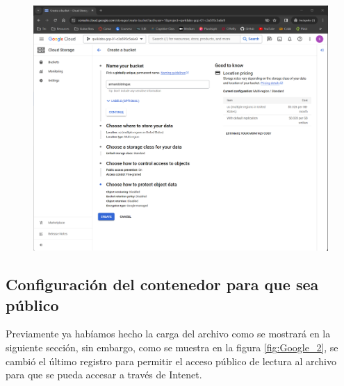 \documentclass[12pt,a4paper]{article}
\begin{document}
\begin{figure}[H]
    \centering
    \includegraphics[width=1\linewidth]{M4_Servicios_Cómputo_en_la_Nube/Tarea_4_Crear_contenedores_en_la_nube/reporte/2-1_Creación_contenedor.png}
    \label{fig:Google_1}
\end{figure}

\vspace{5cm}

\subsection{Configuración del contenedor para que sea público}

Previamente ya habíamos hecho la carga del archivo como se mostrará en la siguiente sección, sin embargo, como se muestra en la figura \ref{fig:Google_2}, se cambió el último registro para permitir el acceso público de lectura al archivo para que se pueda accesar a través de Intenet.
\end{document}
